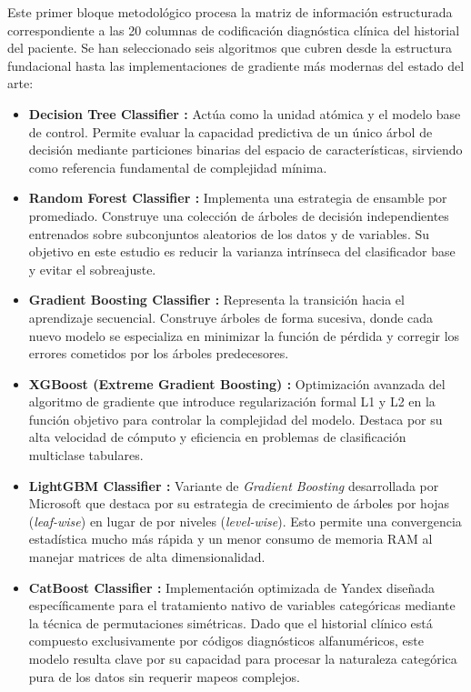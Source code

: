 \documentclass[12pt,a4paper,onecolumn,oneside]{report}
\begin{document}
Este primer bloque metodológico procesa la matriz de información estructurada correspondiente a las 20 columnas de codificación diagnóstica clínica del historial del paciente. Se han seleccionado seis algoritmos que cubren desde la estructura fundacional hasta las implementaciones de gradiente más modernas del estado del arte:

\begin{itemize}
\item \textbf{Decision Tree Classifier \cite{decision_trees}:} Actúa como la unidad atómica y el modelo base de control. Permite evaluar la capacidad predictiva de un único árbol de decisión mediante particiones binarias del espacio de características, sirviendo como referencia fundamental de complejidad mínima.

\item \textbf{Random Forest Classifier \cite{random_forest}:} Implementa una estrategia de ensamble por promediado. Construye una colección de árboles de decisión independientes entrenados sobre subconjuntos aleatorios de los datos y de variables. Su objetivo en este estudio es reducir la varianza intrínseca del clasificador base y evitar el sobreajuste.

\item \textbf{Gradient Boosting Classifier \cite{gradient_boosting}:} Representa la transición hacia el aprendizaje secuencial. Construye árboles de forma sucesiva, donde cada nuevo modelo se especializa en minimizar la función de pérdida y corregir los errores cometidos por los árboles predecesores.

\item \textbf{XGBoost (Extreme Gradient Boosting) \cite{xgboost}:} Optimización avanzada del algoritmo de gradiente que introduce regularización formal L1 y L2 en la función objetivo para controlar la complejidad del modelo. Destaca por su alta velocidad de cómputo y eficiencia en problemas de clasificación multiclase tabulares.

\item \textbf{LightGBM Classifier \cite{lightgbm}:} Variante de \textit{Gradient Boosting} desarrollada por Microsoft que destaca por su estrategia de crecimiento de árboles por hojas (\textit{leaf-wise}) en lugar de por niveles (\textit{level-wise}). Esto permite una convergencia estadística mucho más rápida y un menor consumo de memoria RAM al manejar matrices de alta dimensionalidad.

\item \textbf{CatBoost Classifier \cite{catboost}:} Implementación optimizada de Yandex diseñada específicamente para el tratamiento nativo de variables categóricas mediante la técnica de permutaciones simétricas. Dado que el historial clínico está compuesto exclusivamente por códigos diagnósticos alfanuméricos, este modelo resulta clave por su capacidad para procesar la naturaleza categórica pura de los datos sin requerir mapeos complejos.
\end{itemize}
\end{document}
